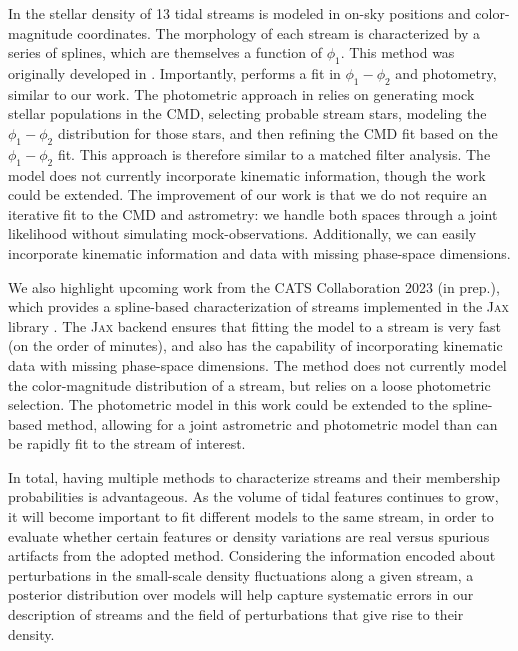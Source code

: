 \documentclass[twocolumn]{aastex631}
\newcommand{\code}[1]{\textsc{#1}}
\newcommand{\package}[1]{\code{#1}}
\begin{document}
        In \citet{Patrick+2022} the stellar density of 13 tidal streams is
        modeled in on-sky positions and color-magnitude coordinates. The
        morphology of each stream is characterized by a series of splines, which
        are themselves a function of $\phi_1$. This method was originally
        developed in \citet{Erkal+2017}.  Importantly, \citet{Patrick+2022}
        performs a fit in $\phi_1-\phi_2$ and photometry, similar to our work.
        The photometric approach in \citet{Patrick+2022} relies on generating
        mock stellar populations in the CMD, selecting probable stream stars,
        modeling the $\phi_1-\phi_2$ distribution for those stars, and then
        refining the CMD fit based on the $\phi_1-\phi_2$ fit. This approach is
        therefore similar to a matched filter analysis. The model does not
        currently incorporate kinematic information, though the work could be
        extended. The improvement of our work is that we do not require an
        iterative fit to the CMD and astrometry: we handle both spaces through a
        joint likelihood without simulating mock-observations. Additionally, we
        can easily incorporate kinematic information and data with missing
        phase-space dimensions.

        We also highlight upcoming work from the CATS Collaboration 2023 (in
        prep.), which provides a spline-based characterization of streams
        implemented in the \package{Jax} library \citep{jax2018github}. The
        \package{Jax} backend ensures that fitting the model to a stream is very
        fast (on the order of minutes), and also has the capability of
        incorporating kinematic data with missing phase-space dimensions. The
        method does not currently model the color-magnitude distribution of a
        stream, but relies on a loose photometric selection. The photometric
        model in this work could be extended to the spline-based method,
        allowing for a joint astrometric and photometric model than can be
        rapidly fit to the stream of interest. 
        
        
        In total, having multiple methods to characterize streams and their
        membership probabilities is advantageous. As the volume of tidal
        features continues to grow, it will become important to fit different
        models to the same stream, in order to evaluate whether certain features
        or density variations are real versus spurious artifacts from the
        adopted method. Considering the information encoded about perturbations
        in the small-scale density fluctuations along a given stream, a
        posterior distribution over models will help capture systematic errors
        in our description of streams and the field of perturbations that give
        rise to their density.  
\end{document}
